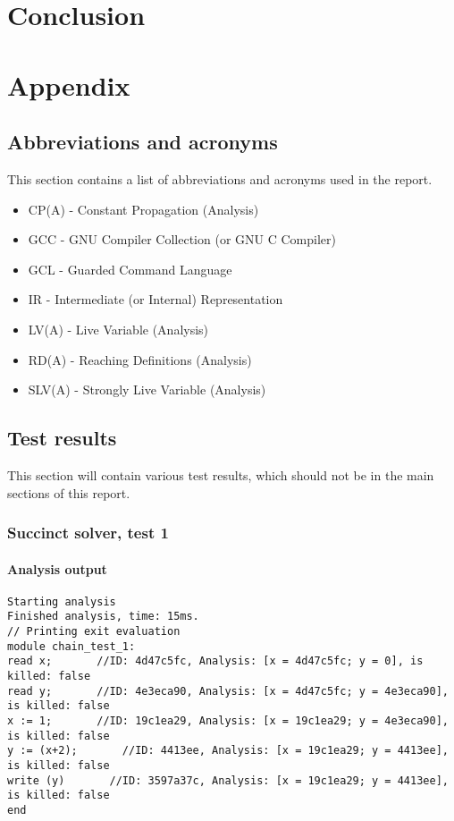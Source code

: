 \documentclass{report}
\begin{document}


\chapter{Conclusion}



\chapter{Appendix}

\section{Abbreviations and acronyms}

This section contains a list of abbreviations and acronyms used in
the report.

\begin{itemize}
\item CP(A) - Constant Propagation (Analysis)
\item GCC - GNU Compiler Collection (or GNU C Compiler)
\item GCL - Guarded Command Language
\item IR - Intermediate (or Internal) Representation
\item LV(A) - Live Variable (Analysis)
\item RD(A) - Reaching Definitions (Analysis)
\item SLV(A) - Strongly Live Variable (Analysis)
\end{itemize}

\section{Test results}

This section will contain various test results, which should not be in the main sections of this report.

\subsection{Succinct solver, test 1}
\subsubsection{Analysis output}
\begin{lstlisting}
Starting analysis
Finished analysis, time: 15ms.
// Printing exit evaluation
module chain_test_1:
read x;       //ID: 4d47c5fc, Analysis: [x = 4d47c5fc; y = 0], is killed: false
read y;       //ID: 4e3eca90, Analysis: [x = 4d47c5fc; y = 4e3eca90], is killed: false
x := 1;       //ID: 19c1ea29, Analysis: [x = 19c1ea29; y = 4e3eca90], is killed: false
y := (x+2);       //ID: 4413ee, Analysis: [x = 19c1ea29; y = 4413ee], is killed: false
write (y)       //ID: 3597a37c, Analysis: [x = 19c1ea29; y = 4413ee], is killed: false
end
\end{lstlisting}
\end{document}
